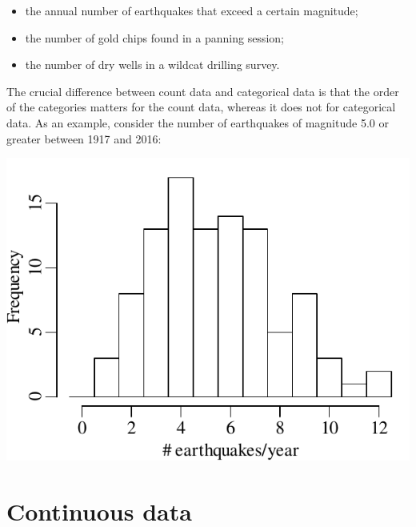 \begin{itemize}
\item the annual number of earthquakes that exceed a certain
  magnitude;
\item the number of gold chips found in a panning session;
\item the number of dry wells in a wildcat drilling survey.
\end{itemize}

The crucial difference between count data and categorical data is that
the order of the categories matters for the count data, whereas it
does not for categorical data.  As an example, consider the number of
earthquakes of magnitude 5.0 or greater between 1917 and 2016:

\noindent\begin{minipage}[t][][b]{.4\textwidth}
  \includegraphics[width=\textwidth]{../figures/declusteredquakesperyear.pdf}
\end{minipage}
\begin{minipage}[t][][t]{.6\textwidth}
  \label{fig:quakecounts}
\end{minipage}

\section{Continuous data}
\label{sec:continuous}


